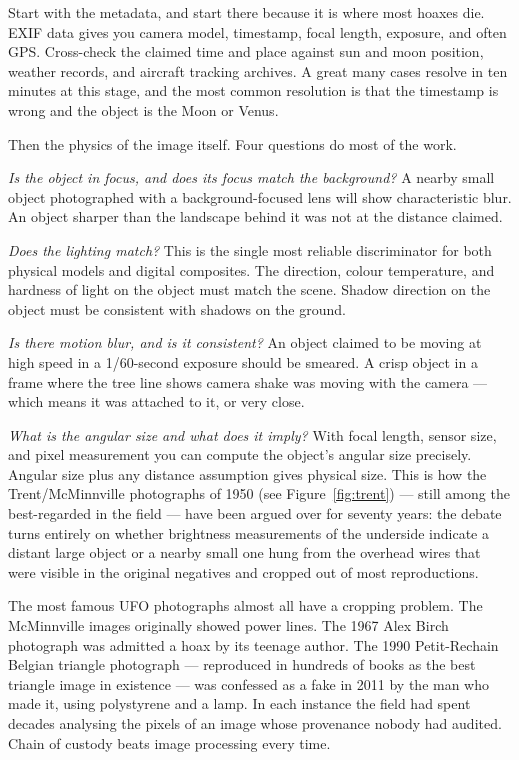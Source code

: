 Start with the metadata, and start there because it is where most hoaxes die. EXIF data
gives you camera model, timestamp, focal length, exposure, and often GPS. Cross-check the
claimed time and place against sun and moon position, weather records, and aircraft
tracking archives. A great many cases resolve in ten minutes at this stage, and the most
common resolution is that the timestamp is wrong and the object is the Moon or Venus.

Then the physics of the image itself. Four questions do most of the work.

\emph{Is the object in focus, and does its focus match the background?} A nearby small
object photographed with a background-focused lens will show characteristic blur. An
object sharper than the landscape behind it was not at the distance claimed.

\emph{Does the lighting match?} This is the single most reliable discriminator for both
physical models and digital composites. The direction, colour temperature, and hardness of
light on the object must match the scene. Shadow direction on the object must be consistent
with shadows on the ground.

\emph{Is there motion blur, and is it consistent?} An object claimed to be moving at high
speed in a 1/60-second exposure should be smeared. A crisp object in a frame where the tree
line shows camera shake was moving with the camera --- which means it was attached to it, or
very close.

\emph{What is the angular size and what does it imply?} With focal length, sensor size, and
pixel measurement you can compute the object's angular size precisely. Angular size plus
any distance assumption gives physical size. This is how the Trent/McMinnville photographs of 1950 (see Figure~\ref{fig:trent}) --- still among the best-regarded in the field --- have been argued over for
seventy years: the debate turns entirely on whether brightness measurements of the
underside indicate a distant large object or a nearby small one hung from the overhead
wires that were visible in the original negatives and cropped out of most reproductions.

\begin{funfact}
The most famous UFO photographs almost all have a cropping problem. The McMinnville images
originally showed power lines. The 1967 Alex Birch photograph was admitted a hoax by its
teenage author. The 1990 Petit-Rechain Belgian triangle photograph --- reproduced in
hundreds of books as the best triangle image in existence --- was confessed as a fake in
2011 by the man who made it, using polystyrene and a lamp. In each instance the field had
spent decades analysing the pixels of an image whose provenance nobody had audited. Chain
of custody beats image processing every time.
\end{funfact}

